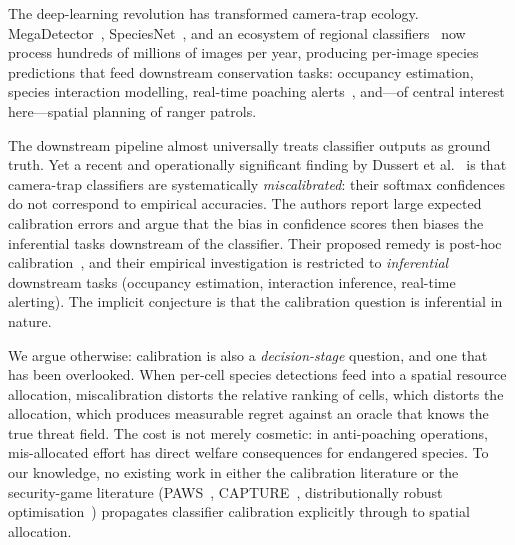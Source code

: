 \documentclass[conference]{IEEEtran}
\begin{document}
The deep-learning revolution has transformed camera-trap ecology.
MegaDetector~\cite{morris2025megadetector,gadot2024crop},
SpeciesNet~\cite{gadot2024crop}, and an ecosystem of regional
classifiers~\cite{norouzzadeh2018automatically} now process hundreds of
millions of images per year, producing per-image species predictions
that feed downstream conservation tasks: occupancy estimation, species
interaction modelling, real-time poaching alerts~\cite{whytock2023real},
and---of central interest here---spatial planning of ranger patrols.

The downstream pipeline almost universally treats classifier outputs as
ground truth. Yet a recent and operationally significant finding by
Dussert et al.~\cite{dussert2025confident} is that camera-trap
classifiers are systematically \emph{miscalibrated}: their softmax
confidences do not correspond to empirical accuracies. The authors
report large expected calibration errors and argue that the bias in
confidence scores then biases the inferential tasks downstream of the
classifier. Their proposed remedy is post-hoc
calibration~\cite{guo2017calibration,platt1999probabilistic}, and their
empirical investigation is restricted to \emph{inferential} downstream
tasks (occupancy estimation, interaction inference, real-time
alerting). The implicit conjecture is that the calibration question is
inferential in nature.

We argue otherwise: calibration is also a \emph{decision-stage}
question, and one that has been overlooked. When per-cell species
detections feed into a spatial resource allocation, miscalibration
distorts the relative ranking of cells, which distorts the allocation,
which produces measurable regret against an oracle that knows the true
threat field. The cost is not merely cosmetic: in anti-poaching
operations, mis-allocated effort has direct welfare consequences for
endangered species. To our knowledge, no existing work in either the
calibration literature or the security-game literature
(PAWS~\cite{fang2016paws}, CAPTURE~\cite{nguyen2016capture},
distributionally robust
optimisation~\cite{esfahani2018wasserstein}) propagates classifier
calibration explicitly through to spatial allocation.
\end{document}
